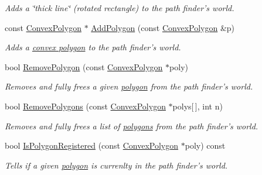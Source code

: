 \begin{DoxyCompactItemize}
\begin{DoxyCompactList}\small\item\em Adds a \char`\"{}thick line\char`\"{} (rotated rectangle) to the path finder's world. \item\end{DoxyCompactList}\item 
const \hyperlink{structPathFinder_1_1ConvexPolygon}{ConvexPolygon} $\ast$ \hyperlink{classPathFinder_ae167f12c8466a501a5a54068f92328c7}{AddPolygon} (const \hyperlink{structPathFinder_1_1ConvexPolygon}{ConvexPolygon} \&p)
\begin{DoxyCompactList}\small\item\em Adds a \hyperlink{structPathFinder_1_1ConvexPolygon}{convex polygon} to the path finder's world. \item\end{DoxyCompactList}\item 
bool \hyperlink{classPathFinder_adbc8795e40ef601769a2659c241b4cb9}{RemovePolygon} (const \hyperlink{structPathFinder_1_1ConvexPolygon}{ConvexPolygon} $\ast$poly)
\begin{DoxyCompactList}\small\item\em Removes and fully frees a given \hyperlink{structPathFinder_1_1ConvexPolygon}{polygon} from the path finder's world. \item\end{DoxyCompactList}\item 
bool \hyperlink{classPathFinder_a4707e0176f1a42c14f71fabc1cca4927}{RemovePolygons} (const \hyperlink{structPathFinder_1_1ConvexPolygon}{ConvexPolygon} $\ast$polys\mbox{[}$\,$\mbox{]}, int n)
\begin{DoxyCompactList}\small\item\em Removes and fully frees a list of \hyperlink{structPathFinder_1_1ConvexPolygon}{polygons} from the path finder's world. \item\end{DoxyCompactList}\item 
bool \hyperlink{classPathFinder_ae4c46e0856f22121c4ac7bb07cc86dc1}{IsPolygonRegistered} (const \hyperlink{structPathFinder_1_1ConvexPolygon}{ConvexPolygon} $\ast$poly) const 
\begin{DoxyCompactList}\small\item\em Tells if a given \hyperlink{structPathFinder_1_1ConvexPolygon}{polygon} is currenlty in the path finder's world. \item\end{DoxyCompactList}\item 

\end{DoxyCompactItemize}
